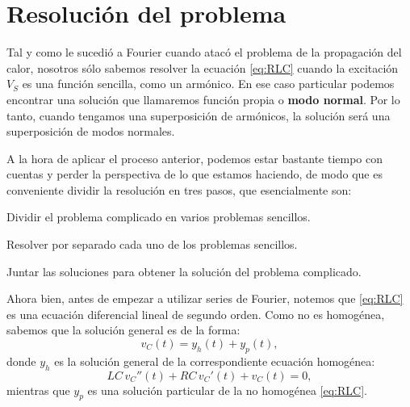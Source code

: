 \section{Resolución del problema}
Tal y como le sucedió a Fourier cuando atacó el problema de la propagación del calor, nosotros sólo sabemos resolver la ecuación \eqref{eq:RLC} cuando la excitación $V_S$ es una función sencilla, como un armónico. En ese caso particular podemos encontrar una solución que llamaremos función propia o \textbf{modo normal}. Por lo tanto, cuando tengamos una superposición de armónicos, la solución será una superposición de modos normales.

A la hora de aplicar el proceso anterior, podemos estar bastante tiempo con cuentas y perder la perspectiva de lo que estamos haciendo, de modo que es conveniente dividir la resolución en tres pasos, que esencialmente son:
\begin{mybox}
\begin{enumerate}[{\bfseries [1]}]
  \item Dividir el problema complicado en varios problemas sencillos.
  \item Resolver por separado cada uno de los problemas sencillos.
  \item Juntar las soluciones para obtener la solución del problema complicado.
\end{enumerate}
\end{mybox}


Ahora bien, antes de empezar a utilizar series de Fourier, notemos que \eqref{eq:RLC} es una ecuación diferencial lineal de segundo orden. Como no es homogénea, sabemos que  la solución general es de la forma:
\[
v_C(t) = y_h(t) + y_p(t),
\]
donde $y_h$ es la solución general de la correspondiente ecuación homogénea:
\begin{equation}
  \label{eq:HomogeneaRLC}
  LC \,v_C '' (t) + RC\, v_C'(t) + v_C(t) = 0,
\end{equation}
 mientras que $y_p$ es una solución particular de la no homogénea \eqref{eq:RLC}.

